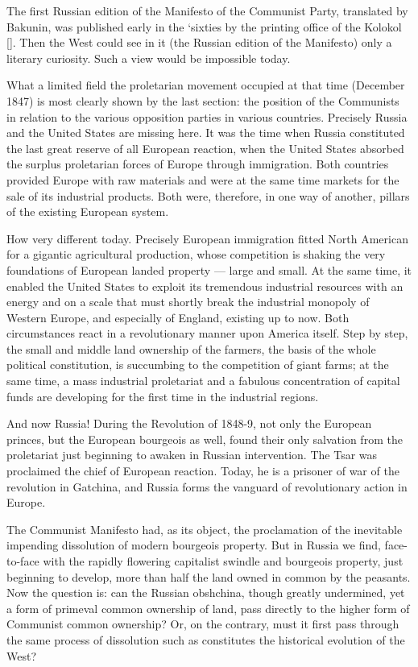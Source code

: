 The first Russian edition of the Manifesto of the Communist Party, translated by Bakunin, was published early in the ‘sixties by the printing office of the Kolokol []. Then the West could see in it (the Russian edition of the Manifesto) only a literary curiosity. Such a view would be impossible today. 

What a limited field the proletarian movement occupied at that time (December 1847) is most clearly shown by the last section: the position of the Communists in relation to the various opposition parties in various countries. Precisely Russia and the United States are missing here. It was the time when Russia constituted the last great reserve of all European reaction, when the United States absorbed the surplus proletarian forces of Europe through immigration. Both countries provided Europe with raw materials and were at the same time markets for the sale of its industrial products. Both were, therefore, in one way of another, pillars of the existing European system. 

How very different today. Precisely European immigration fitted North American for a gigantic agricultural production, whose competition is shaking the very foundations of European landed property --- large and small. At the same time, it enabled the United States to exploit its tremendous industrial resources with an energy and on a scale that must shortly break the industrial monopoly of Western Europe, and especially of England, existing up to now. Both circumstances react in a revolutionary manner upon America itself. Step by step, the small and middle land ownership of the farmers, the basis of the whole political constitution, is succumbing to the competition of giant farms; at the same time, a mass industrial proletariat and a fabulous concentration of capital funds are developing for the first time in the industrial regions. 

And now Russia! During the Revolution of 1848-9, not only the European princes, but the European bourgeois as well, found their only salvation from the proletariat just beginning to awaken in Russian intervention. The Tsar was proclaimed the chief of European reaction. Today, he is a prisoner of war of the revolution in Gatchina, and Russia forms the vanguard of revolutionary action in Europe. 

The Communist Manifesto had, as its object, the proclamation of the inevitable impending dissolution of modern bourgeois property. But in Russia we find, face-to-face with the rapidly flowering capitalist swindle and bourgeois property, just beginning to develop, more than half the land owned in common by the peasants. Now the question is: can the Russian obshchina, though greatly undermined, yet a form of primeval common ownership of land, pass directly to the higher form of Communist common ownership? Or, on the contrary, must it first pass through the same process of dissolution such as constitutes the historical evolution of the West? 

